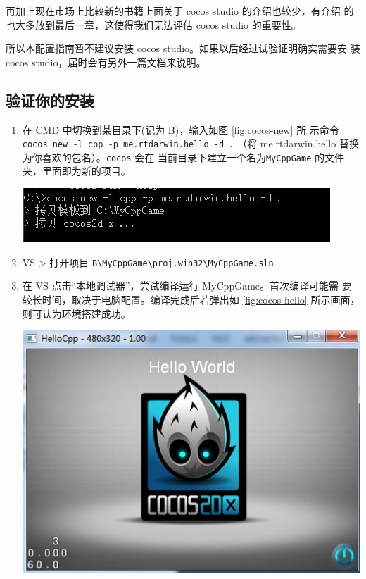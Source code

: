\documentclass[a4paper, 10pt]{article}
\newcommand{\inlinecode}[1]{\colorbox{inlinecodecolor}{\texttt{#1}}}
\begin{document}
再加上现在市场上比较新的书籍上面关于 cocos studio 的介绍也较少，有介绍
的也大多放到最后一章，这使得我们无法评估 cocos studio 的重要性。

所以本配置指南暂不建议安装 cocos studio。如果以后经过试验证明确实需要安
装 cocos studio，届时会有另外一篇文档来说明。

\subsection{验证你的安装}

\begin{enumerate}
\item 在 CMD 中切换到某目录下(记为 B)，输入如图 \ref{fig:cocos-new} 所
  示命令\\ \inlinecode{cocos new -l cpp -p me.rtdarwin.hello -d
    .} （将 me.rtdarwin.hello 替换为你喜欢的包名）。\texttt{cocos} 会在
  当前目录下建立一个名为\texttt{MyCppGame} 的文件夹，里面即为新的项目。
  \begin{center}
    \includegraphics*[width=.8\textwidth]{images/cocos-new}
  \end{center}

\item VS > 打开项目
  \texttt{B\textbackslash{}MyCppGame\textbackslash{}proj.win32\textbackslash{}MyCppGame.sln}
\item 在 VS 点击``本地调试器''，尝试编译运行 MyCppGame。首次编译可能需
  要较长时间，取决于电脑配置。编译完成后若弹出如 \ref{fig:cocos-hello}
  所示画面，则可认为环境搭建成功。
  \begin{center}
    \includegraphics*[width=.8\textwidth]{images/cocos-hello}
  \end{center}
\end{enumerate}
\end{document}

